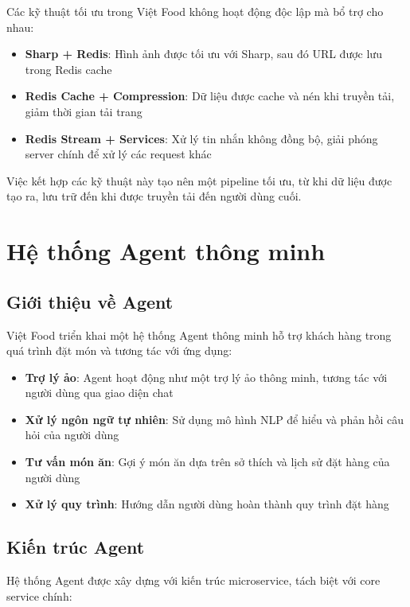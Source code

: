 Các kỹ thuật tối ưu trong Việt Food không hoạt động độc lập mà bổ trợ cho nhau:

\begin{itemize}
    \item \textbf{Sharp + Redis}: Hình ảnh được tối ưu với Sharp, sau đó URL được lưu trong Redis cache
    \item \textbf{Redis Cache + Compression}: Dữ liệu được cache và nén khi truyền tải, giảm thời gian tải trang
    \item \textbf{Redis Stream + Services}: Xử lý tin nhắn không đồng bộ, giải phóng server chính để xử lý các request khác
\end{itemize}

Việc kết hợp các kỹ thuật này tạo nên một pipeline tối ưu, từ khi dữ liệu được tạo ra, lưu trữ đến khi được truyền tải đến người dùng cuối.

\section{Hệ thống Agent thông minh}

\subsection{Giới thiệu về Agent}

Việt Food triển khai một hệ thống Agent thông minh hỗ trợ khách hàng trong quá trình đặt món và tương tác với ứng dụng:

\begin{itemize}
    \item \textbf{Trợ lý ảo}: Agent hoạt động như một trợ lý ảo thông minh, tương tác với người dùng qua giao diện chat
    \item \textbf{Xử lý ngôn ngữ tự nhiên}: Sử dụng mô hình NLP để hiểu và phản hồi câu hỏi của người dùng
    \item \textbf{Tư vấn món ăn}: Gợi ý món ăn dựa trên sở thích và lịch sử đặt hàng của người dùng
    \item \textbf{Xử lý quy trình}: Hướng dẫn người dùng hoàn thành quy trình đặt hàng
\end{itemize}

\subsection{Kiến trúc Agent}

Hệ thống Agent được xây dựng với kiến trúc microservice, tách biệt với core service chính:

